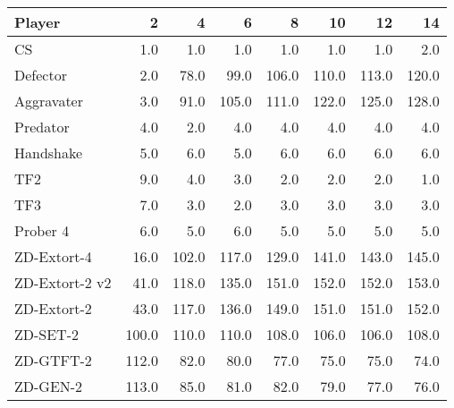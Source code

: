 \begin{tabular}{lrrrrrrr}
\toprule
         Player &      2 &      4 &      6 &      8 &     10 &     12 &     14 \\
\midrule
             CS &    1.0 &    1.0 &    1.0 &    1.0 &    1.0 &    1.0 &    2.0 \\
       Defector &    2.0 &   78.0 &   99.0 &  106.0 &  110.0 &  113.0 &  120.0 \\
     Aggravater &    3.0 &   91.0 &  105.0 &  111.0 &  122.0 &  125.0 &  128.0 \\
       Predator &    4.0 &    2.0 &    4.0 &    4.0 &    4.0 &    4.0 &    4.0 \\
      Handshake &    5.0 &    6.0 &    5.0 &    6.0 &    6.0 &    6.0 &    6.0 \\
            TF2 &    9.0 &    4.0 &    3.0 &    2.0 &    2.0 &    2.0 &    1.0 \\
            TF3 &    7.0 &    3.0 &    2.0 &    3.0 &    3.0 &    3.0 &    3.0 \\
       Prober 4 &    6.0 &    5.0 &    6.0 &    5.0 &    5.0 &    5.0 &    5.0 \\
    ZD-Extort-4 &   16.0 &  102.0 &  117.0 &  129.0 &  141.0 &  143.0 &  145.0 \\
 ZD-Extort-2 v2 &   41.0 &  118.0 &  135.0 &  151.0 &  152.0 &  152.0 &  153.0 \\
    ZD-Extort-2 &   43.0 &  117.0 &  136.0 &  149.0 &  151.0 &  151.0 &  152.0 \\
       ZD-SET-2 &  100.0 &  110.0 &  110.0 &  108.0 &  106.0 &  106.0 &  108.0 \\
      ZD-GTFT-2 &  112.0 &   82.0 &   80.0 &   77.0 &   75.0 &   75.0 &   74.0 \\
       ZD-GEN-2 &  113.0 &   85.0 &   81.0 &   82.0 &   79.0 &   77.0 &   76.0 \\
\bottomrule
\end{tabular}
